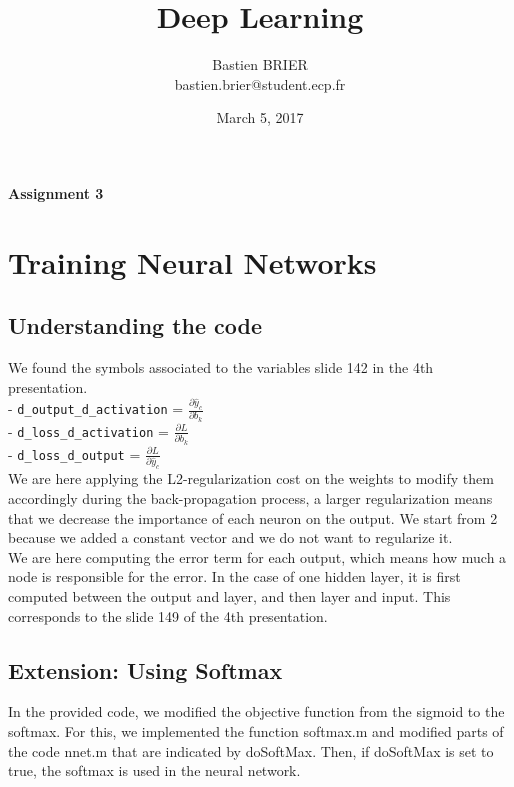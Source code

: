 \documentclass[11pt, oneside]{article}   	%
\title{Deep Learning}
\author{Bastien BRIER\\ bastien.brier@student.ecp.fr}
\date{March 5, 2017}				%
\begin{document}
\maketitle
\vspace{-10pt}
\begin{center}
{\LARGE \bf Assignment 3}\\
\vspace{10pt}
\end{center}

\section{Training Neural Networks}
\vspace{4pt}

\subsection{Understanding the code}
\vspace{4pt}
We found the symbols associated to the variables slide 142 in the 4th presentation.\\
 - \texttt{d\_output\_d\_activation} = $ \frac{\partial \hat{y}_{c}}{\partial b_{k}} $\\
 - \texttt{d\_loss\_d\_activation} = $ \frac{\partial L}{\partial b_{k}} $\\
 - \texttt{d\_loss\_d\_output} = $ \frac{\partial L}{\partial \hat{y}_{c}} $\\
\newline
We are here applying the L2-regularization cost on the weights to modify them accordingly during the back-propagation process, a larger regularization means that we decrease the importance of each neuron on the output. We start from 2 because we added a constant vector and we do not want to regularize it.\\
\newline
We are here computing the error term for each output, which means how much a node is responsible for the error. In the case of one hidden layer, it is first computed between the output and layer, and then layer and input. This corresponds to the slide 149 of the 4th presentation.

\subsection{Extension: Using Softmax}
\vspace{4pt}
In the provided code, we modified the objective function from the sigmoid to the softmax. For this, we implemented the function softmax.m and modified parts of the code nnet.m that are indicated by doSoftMax. Then, if doSoftMax is set to true, the softmax is used in the neural network.
\end{document}
